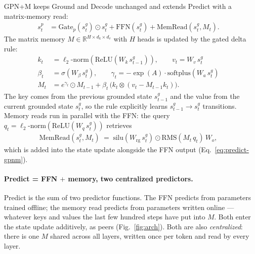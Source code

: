 \documentclass{article}
\begin{document}
GPN+M keeps Ground and Decode unchanged and extends Predict with a
matrix-memory read:
\begin{align}
s^p_t &= \text{Gate}_p(s^g_t) \odot s^g_t
   + \text{FFN}(s^g_t)
   + \text{MemRead}(s^g_t, M_t).
\label{eq:predict-gpnm}
\end{align}
The matrix memory $M \in \mathbb{R}^{H \times d_k \times d_v}$ with
$H$ heads is updated by the gated delta rule:
\begin{align}
k_t &= \ell_2\text{-norm}(\text{ReLU}(W_k\, s^g_{t-1})),\qquad
v_t = W_v\, s^g_t
\label{eq:kv}\\
\beta_t &= \sigma(W_\beta\, s^g_t),\qquad
\gamma_t = -\exp(A)\cdot\text{softplus}(W_a\, s^g_t)
\label{eq:beta-gamma}\\
M_t &= e^{\gamma_t} \odot M_{t-1}
   + \beta_t\, \bigl(k_t \otimes (v_t - M_{t-1} k_t)\bigr).
\label{eq:mwrite}
\end{align}
The key comes from the previous grounded state $s^g_{t-1}$ and the
value from the current grounded state $s^g_t$, so the rule explicitly
learns $s^g_{t-1} \to s^g_t$ transitions. Memory reads run in parallel
with the FFN: the query $q_t =
\ell_2\text{-norm}(\text{ReLU}(W_q\, s^g_t))$ retrieves
\begin{align}
\text{MemRead}(s^g_t, M_t) \;=\;
   \text{silu}(W_\text{rg}\, s^g_t)
   \odot \text{RMS}(M_t\, q_t)\, W_o,
\label{eq:mread}
\end{align}
which is added into the state update alongside the FFN output
(Eq.~\ref{eq:predict-gpnm}).

\paragraph{Predict = FFN $+$ memory, two centralized predictors.}
Predict is the sum of two predictor functions. The FFN predicts
from parameters trained offline; the memory read predicts from
parameters written online --- whatever keys and values the last few
hundred steps have put into $M$. Both enter the state update
additively, as peers (Fig.~\ref{fig:arch}). Both are also
\emph{centralized}: there is one $M$ shared across all layers,
written once per token and read by every layer.
\end{document}
